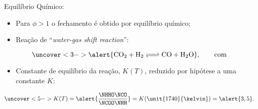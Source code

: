     \begin{frame}{Equilíbrio Químico:}\vspace*{-2em}
        \begin{itemize}
            \item<1-> Para \alert{$\phi > 1$} o fechamento é obtido por \alert{equilíbrio
                químico};
                \\[\medskipamount]
            \item<2-> Reação de ``\alert{\textit{water-gas shift reaction\/}}'':
        \end{itemize}
        \vspace*{0.8em}\begin{equation*}
            \uncover<3->{
                \alert{\mbox{\ce{CO2 + H2 <=> CO + H2O}}},\qquad\mbox{com}
            }
        \end{equation*}
        \vspace*{-0.8em}\begin{itemize}
            \item<4-> \alert{Constante de equilíbrio} da reação, $K(T)$, reduzido por hipótese a
                uma constante \alert{$K$}:
        \end{itemize}
        \vspace*{0.8em}\begin{equation*}
            \uncover<5->{
                K(T) = \alert{\frac{\NHHO\NCO}{\NCOO\NHH}} =
                K(\unit{1740}{\kelvin}) = \alert{3,5}.
            }
        \end{equation*}
    \end{frame}

